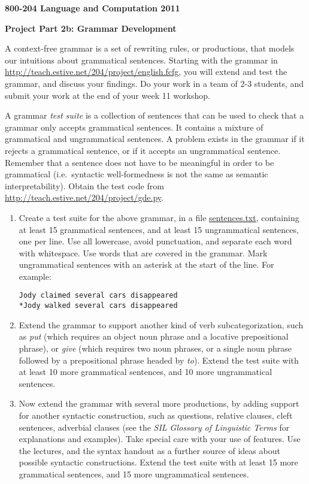 \documentclass[a4paper,11pt]{article}
\begin{document}
\centerline{\LARGE\bf 800-204 Language and Computation 2011}\vspace{2ex}

\centerline{\large\bf Project Part 2b: Grammar Development}\vspace{1ex}

A context-free grammar is a set of rewriting rules, or productions, that models
our intuitions about grammatical sentences.  Starting with the grammar
in \url{http://teach.estive.net/204/project/english.fcfg},
you will extend and test the grammar, and discuss your findings.
Do your work in a team of 2-3 students,
and submit your work at the end of your week 11 workshop.

A grammar \emph{test suite} is a collection of sentences that can be used to
check that a grammar only accepts grammatical sentences.  It contains a mixture of
grammatical and ungrammatical sentences.  A problem exists in the grammar if it
rejects a grammatical sentence, or if it accepts an ungrammatical sentence.
Remember that a sentence does not have to be meaningful in order to be
grammatical (i.e.\ syntactic well-formedness is not the same as semantic interpretability).
Obtain the test code from \url{http://teach.estive.net/204/project/gde.py}. 

\begin{enumerate}
\item Create a test suite for the above grammar, in a file
\url{sentences.txt}, containing at least 15 grammatical sentences, and at least
15 ungrammatical sentences, one per line.  Use all lowercase, avoid
punctuation, and separate each word with whitespace.   Use words that
are covered in the grammar.
Mark ungrammatical sentences with an asterisk
at the start of the line.  For example:

\begin{verbatim}
Jody claimed several cars disappeared
*Jody walked several cars disappeared
\end{verbatim}

\item Extend the grammar to support another kind of verb subcategorization,
such as \emph{put} (which requires an object noun phrase and a locative
prepositional phrase), or \emph{give} (which requires two noun phrases, or a
single noun phrase followed by a prepositional phrase headed by \emph{to}).
Extend the test suite with at least 10 more grammatical sentences, and 10 more
ungrammatical sentences.

\item Now extend the grammar with several more productions, by adding support
for another syntactic construction, such as
questions, relative clauses, cleft sentences, adverbial clauses
(see the \emph{SIL Glossary of Linguistic Terms} for explanations
and examples).  Take special care with your use of features.
Use the lectures, and the syntax handout
as a further source of ideas about possible syntactic constructions.  Extend the
test suite with at least 15 more grammatical sentences, and 15 more ungrammatical sentences.

\end{enumerate}
\end{document}
